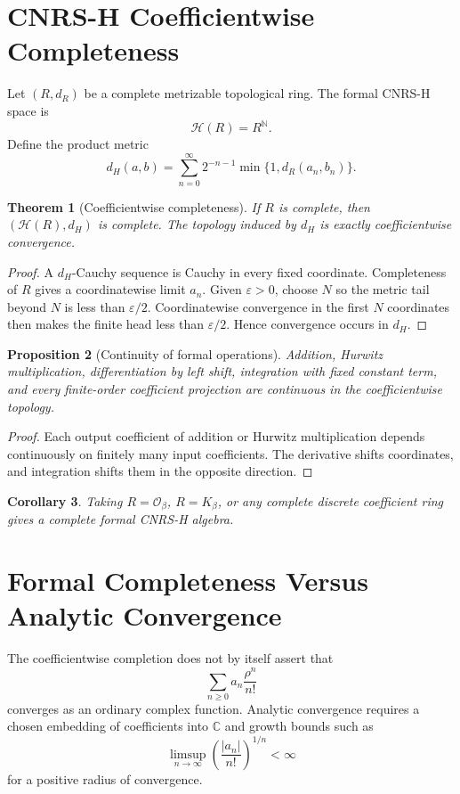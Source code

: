 \documentclass[11pt]{article}
\newtheorem{theorem}{Theorem}[section]
\newtheorem{proposition}[theorem]{Proposition}
\newtheorem{corollary}[theorem]{Corollary}
\newcommand{\C}{\mathbb C}
\newcommand{\N}{\mathbb N}
\newcommand{\Ob}{\mathcal O_\beta}
\newcommand{\Kb}{K_\beta}
\newcommand{\Hs}{\mathcal H}
\begin{document}
\section{CNRS-H Coefficientwise Completeness}

Let $(R,d_R)$ be a complete metrizable topological ring.  The formal CNRS-H space is
\[
\Hs(R)=R^\N.
\]
Define the product metric
\[
d_H(a,b)
=
\sum_{n=0}^\infty 2^{-n-1}\min\{1,d_R(a_n,b_n)\}.
\]

\begin{theorem}[Coefficientwise completeness]
If $R$ is complete, then $(\Hs(R),d_H)$ is complete.  The topology induced by $d_H$ is exactly coefficientwise convergence.
\end{theorem}

\begin{proof}
A $d_H$-Cauchy sequence is Cauchy in every fixed coordinate.  Completeness of $R$ gives a coordinatewise limit $a_n$.  Given $\varepsilon>0$, choose $N$ so the metric tail beyond $N$ is less than $\varepsilon/2$.  Coordinatewise convergence in the first $N$ coordinates then makes the finite head less than $\varepsilon/2$.  Hence convergence occurs in $d_H$.
\end{proof}

\begin{proposition}[Continuity of formal operations]
Addition, Hurwitz multiplication, differentiation by left shift, integration with fixed constant term, and every finite-order coefficient projection are continuous in the coefficientwise topology.
\end{proposition}

\begin{proof}
Each output coefficient of addition or Hurwitz multiplication depends continuously on finitely many input coefficients.  The derivative shifts coordinates, and integration shifts them in the opposite direction.
\end{proof}

\begin{corollary}
Taking $R=\Ob$, $R=\Kb$, or any complete discrete coefficient ring gives a complete formal CNRS-H algebra.
\end{corollary}

\section{Formal Completeness Versus Analytic Convergence}

The coefficientwise completion does not by itself assert that
\[
\sum_{n\ge0}a_n\frac{\rho^n}{n!}
\]
converges as an ordinary complex function.  Analytic convergence requires a chosen embedding of coefficients into $\C$ and growth bounds such as
\[
\limsup_{n\to\infty}
\left(\frac{|a_n|}{n!}\right)^{1/n}<\infty
\]
for a positive radius of convergence.
\end{document}
